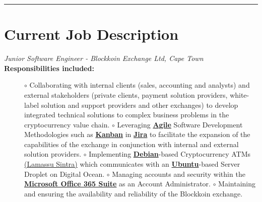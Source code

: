 \documentclass[10pt,a4paper,ragged2e,withhyper]{altacv}
\newcommand{\MyVerticalRule}{
		\textcolor{ColorOne}
		{
		  \rule
		  	{1pt}
		  	{\textheight}
		}
	}
\begin{document}
    \begin{adjustbox}{valign=t}
        \begin{minipage}{0.05\textwidth} %
        \MyVerticalRule  
        \end{minipage}
    \end{adjustbox} 
    \begin{adjustbox}{valign=t}
        \begin{minipage}{0.6\textwidth}
            \section*{Current Job Description}
                \begin{description}
                
                
                \item[\normalfont \textcolor{ColorOne}{\textit{Junior Software Engineer - Blockkoin Exchange Ltd, Cape Town}}]\break
                \break
                \item[]\break
                \break
                  \item[\normalfont\textbf{Responsibilities included:}]\hfill
                  \break
                   \textcolor{ColorOne}{$\circ$} Collaborating with internal clients  (sales, accounting and analysts) and external stakeholders (private clients, payment solution providers, white-label solution and support providers and other exchanges) to develop integrated technical solutions to complex business problems in the cryptocurrency value chain.\hfill\break
					\textcolor{ColorOne}{$\circ$} Leveraging \underline{{\textbf{Agile}}} Software Development Methodologies such as \underline{\textbf{Kanban}} in \underline{\textbf{Jira}} to facilitate the expansion of the capabilities of the exchange in \newline conjunction with internal and external solution providers.\hfill\break
					\textcolor{ColorOne}{$\circ$} Implementing \underline{\textbf{Debian}}-based Cryptocurrency ATMs \href{https://lamassu.is/product/sintra}{(Lamassu Sintra)} which communicates with an \underline{\textbf{Ubuntu}}-based Server Droplet on Digital Ocean. \hfill\break
                    \textcolor{ColorOne}{$\circ$} Managing accounts and security within the \underline{\textbf{Microsoft Office 365 Suite}} as an Account Administrator.\hfill\break
                    \textcolor{ColorOne}{$\circ$} Maintaining and ensuring the availability and reliability of the Blockkoin exchange.\hfill\break

\end{description}
\end{minipage}
\end{adjustbox}
\end{document}
